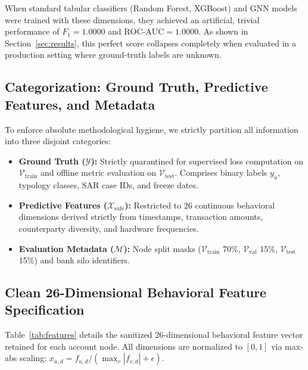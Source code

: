 When standard tabular classifiers (Random Forest, XGBoost) and GNN models were trained with these dimensions, they achieved an artificial, trivial performance of $F_1 = 1.0000$ and $\text{ROC-AUC} = 1.0000$. As shown in Section~\ref{sec:results}, this perfect score collapses completely when evaluated in a production setting where ground-truth labels are unknown.

\subsection{Categorization: Ground Truth, Predictive Features, and Metadata}
To enforce absolute methodological hygiene, we strictly partition all information into three disjoint categories:
\begin{itemize}
    \item \textbf{Ground Truth ($\mathcal{Y}$):} Strictly quarantined for supervised loss computation on $\mathcal{V}_{\text{train}}$ and offline metric evaluation on $\mathcal{V}_{\text{test}}$. Comprises binary labels $y_u$, typology classes, SAR case IDs, and freeze dates.
    \item \textbf{Predictive Features ($\mathcal{X}_{\text{safe}}$):} Restricted to 26 continuous behavioral dimensions derived strictly from timestamps, transaction amounts, counterparty diversity, and hardware frequencies.
    \item \textbf{Evaluation Metadata ($\mathcal{M}$):} Node split masks ($\mathcal{V}_{\text{train}}$ 70\%, $\mathcal{V}_{\text{val}}$ 15\%, $\mathcal{V}_{\text{test}}$ 15\%) and bank silo identifiers.
\end{itemize}

\subsection{Clean 26-Dimensional Behavioral Feature Specification}
Table~\ref{tab:features} details the sanitized 26-dimensional behavioral feature vector retained for each account node. All dimensions are normalized to $[0, 1]$ via max-abs scaling: $x_{u, d} = f_{u, d} / (\max_v |f_{v, d}| + \epsilon)$.

